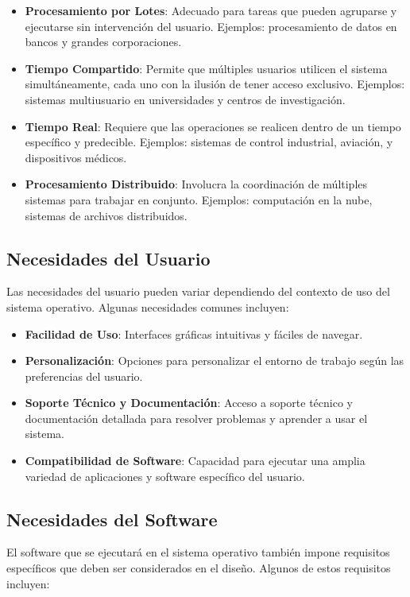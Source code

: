 \begin{itemize}
	\item \textbf{Procesamiento por Lotes}: Adecuado para tareas que pueden agruparse y ejecutarse sin intervención del usuario. Ejemplos: procesamiento de datos en bancos y grandes corporaciones.
	\item \textbf{Tiempo Compartido}: Permite que múltiples usuarios utilicen el sistema simultáneamente, cada uno con la ilusión de tener acceso exclusivo. Ejemplos: sistemas multiusuario en universidades y centros de investigación.
	\item \textbf{Tiempo Real}: Requiere que las operaciones se realicen dentro de un tiempo específico y predecible. Ejemplos: sistemas de control industrial, aviación, y dispositivos médicos.
	\item \textbf{Procesamiento Distribuido}: Involucra la coordinación de múltiples sistemas para trabajar en conjunto. Ejemplos: computación en la nube, sistemas de archivos distribuidos.
\end{itemize}

\subsection{Necesidades del Usuario}

Las necesidades del usuario pueden variar dependiendo del contexto de uso del sistema operativo. Algunas necesidades comunes incluyen:

\begin{itemize}
	\item \textbf{Facilidad de Uso}: Interfaces gráficas intuitivas y fáciles de navegar.
	\item \textbf{Personalización}: Opciones para personalizar el entorno de trabajo según las preferencias del usuario.
	\item \textbf{Soporte Técnico y Documentación}: Acceso a soporte técnico y documentación detallada para resolver problemas y aprender a usar el sistema.
	\item \textbf{Compatibilidad de Software}: Capacidad para ejecutar una amplia variedad de aplicaciones y software específico del usuario.
\end{itemize}

\subsection{ Necesidades del Software}

El software que se ejecutará en el sistema operativo también impone requisitos específicos que deben ser considerados en el diseño. Algunos de estos requisitos incluyen:

